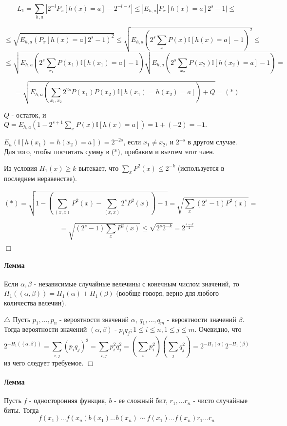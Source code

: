 \documentclass[12pt, a4paper]{article}
\begin{document}
$$L_1 = \sum_{h, a} |2^{-l} P_x[h(x) = a] - 2^{-l-s}| \leq |E_{h, a} |P_x[h(x) = a] 2^s - 1| \leq $$ 

$$ \leq \sqrt{E_{h, a} (P_x[h(x) = a] 2^s - 1)^2} \leq
\sqrt{E_{h, a} (2^s \sum_x P(x) \mathbb{I}[h(x) = a] - 1)^2} \leq$$
$$\leq \sqrt{E_{h, a} (2^s \sum_{x_1} P(x_1) \mathbb{I}[h(x_1) = a] - 1)} \sqrt{E_{h, a} (2^s \sum_{x_2} P(x_2) \mathbb{I}[h(x_2) = a] - 1)} =$$

$$ =\sqrt{E_{h, a} (\sum\limits_{x_1, x_2} 2^{2s} P(x_1) P(x_2) \mathbb{I}[h(x_1) = h(x_2) = a]) + Q} = (*)$$

$Q$ - остаток, и $Q = E_{h, a}(1 - 2^{s + 1} \sum\limits_x P(x) \mathbb{I}[h(x)=a]) = 1 + (-2) = -1$.

$E_h(\mathbb{I}[h(x_1) = h(x_2) = a]) = 2^{-2s}$, если $x_1 \neq x_2$, и $2^{-s}$ в другом случае. Для того, чтобы посчитать сумму в (*), прибавим и вычтем этот член.

Из условия $H_1(x)  \geq k$ вытекает, что $\sum\limits_x P^2(x) \leq 2^{-k}$ (используется в последнем неравенстве).

$$(*) = \sqrt{1 - (\sum\limits_{(x, x)} P^2(x) - \sum\limits_{(x, x)} 2^{s} P^2(x) ) - 1} = 
\sqrt{\sum\limits_x (2^s - 1) P^2 (x)} =$$

$$=\sqrt{(2^s - 1) \sum\limits_x P^2(x)} \leq
\sqrt{2^s 2^{-k}} =
2^{\frac{s - k}{2}}$$

$\Box$

\paragraph{Лемма} Если $\alpha, \beta$ - независимые случайные велечины с конечным числом значений, то $H_1((\alpha, \beta)) = H_1(\alpha) + H_1(\beta)$ (вообще говоря, верно для любого количества велечин).

$\triangle$ Пусть $p_1, \dots, p_n$ - вероятности значений $\alpha$, $q_1, ..., q_m$ - вероятности значений $\beta$. Тогда вероятности значений $(\alpha, \beta)$ - $p_i q_j; 1 \leq i \leq n, 1 \leq j \leq m$. Очевидно, что
$$
2^{-H_1((\alpha, \beta))} = \sum\limits_{i, j} (p_i q_j)^2 = \sum\limits_{i, j} p_i^2 q_j^2 =
(\sum\limits_{i} p_i^2)(\sum\limits_{j} q_j^2) = 2^{-H_1(\alpha)} 2^{-H_1(\beta)}
$$
из чего следует требуемое.
$\Box$

\paragraph{Лемма} Пусть $f$ - односторонняя функция, $b$ - ее сложный бит, $r_1, \dots r_n$ - чисто случайные биты. Тогда
$$f(x_1) \dots f(x_n) b(x_1) \dots b(x_n) \sim f(x_1) \dots f(x_n) r_1 \dots r_n$$
\end{document}
